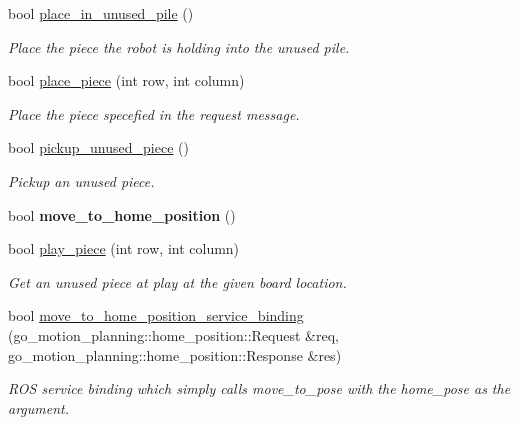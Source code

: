\begin{DoxyCompactItemize}
\mbox{\label{classgo__motion__planner_ad532e8f592e7f82f2c1b216c39a2cf30}} 
bool \hyperlink{classgo__motion__planner_ad532e8f592e7f82f2c1b216c39a2cf30}{place\+\_\+in\+\_\+unused\+\_\+pile} ()
\begin{DoxyCompactList}\small\item\em Place the piece the robot is holding into the unused pile. \end{DoxyCompactList}\item 
bool \hyperlink{classgo__motion__planner_a2b49683bb6488c9cab3e22a40e4e854e}{place\+\_\+piece} (int row, int column)
\begin{DoxyCompactList}\small\item\em Place the piece specefied in the request message. \end{DoxyCompactList}\item 
\mbox{\label{classgo__motion__planner_a1d0d55d9c4b20319a3164d1656ebcf21}} 
bool \hyperlink{classgo__motion__planner_a1d0d55d9c4b20319a3164d1656ebcf21}{pickup\+\_\+unused\+\_\+piece} ()
\begin{DoxyCompactList}\small\item\em Pickup an unused piece. \end{DoxyCompactList}\item 
\mbox{\label{classgo__motion__planner_ac27b5567f1dd182fbf3d99b56e10155f}} 
bool {\bfseries move\+\_\+to\+\_\+home\+\_\+position} ()
\item 
bool \hyperlink{classgo__motion__planner_a4eaf2e9291a24b12dafc684cd779c99a}{play\+\_\+piece} (int row, int column)
\begin{DoxyCompactList}\small\item\em Get an unused piece at play at the given board location. \end{DoxyCompactList}\item 
\mbox{\label{classgo__motion__planner_a0c6c7c5eaccf9b3015cd1e85afdc12b5}} 
bool \hyperlink{classgo__motion__planner_a0c6c7c5eaccf9b3015cd1e85afdc12b5}{move\+\_\+to\+\_\+home\+\_\+position\+\_\+service\+\_\+binding} (go\+\_\+motion\+\_\+planning\+::home\+\_\+position\+::\+Request \&req, go\+\_\+motion\+\_\+planning\+::home\+\_\+position\+::\+Response \&res)
\begin{DoxyCompactList}\small\item\em R\+OS service binding which simply calls move\+\_\+to\+\_\+pose with the home\+\_\+pose as the argument. \end{DoxyCompactList}\item 

\end{DoxyCompactItemize}
